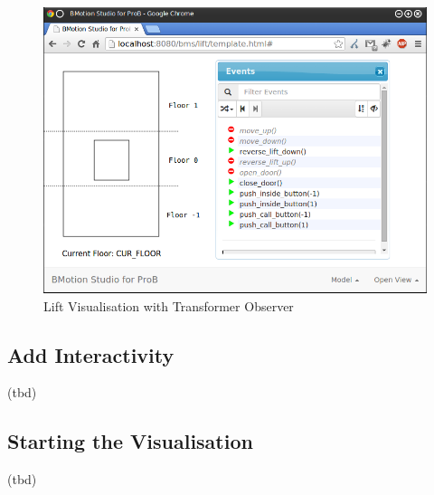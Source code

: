 \begin{figure}[!ht]
\begin{center}
	\includegraphics[width=\textwidth]{img/tutorial/tut_04.png}
	\caption{Lift Visualisation with Transformer Observer}
	\label{fig_tut_03_running1}
\end{center}
\end{figure}

\subsection{Add Interactivity}

(tbd)

\subsection{Starting the Visualisation}

(tbd)
